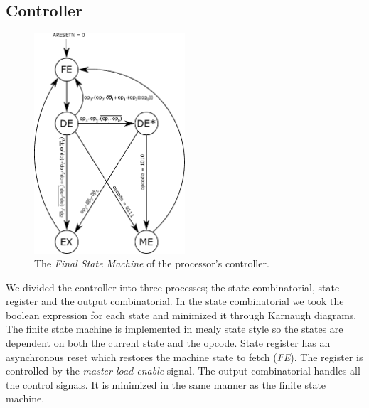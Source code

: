 \documentclass[a4,11pt]{article}
\begin{document}
\subsection{Controller}

\begin{figure}[h!]
	\centering
	\includegraphics[width=0.5\textwidth]{Figurer/procController_FSM_Mealy}
	\caption{The {\it Final State Machine} of the processor's controller.}
	\label{fig:fsm}
\end{figure}


We divided the controller into three processes; the state combinatorial, state register and
the output combinatorial. In the state combinatorial we took the boolean expression for each 
state and minimized it through Karnaugh diagrams. The finite state machine is implemented in 
mealy state style so the states are dependent on both the current state and the opcode. 
State register has an asynchronous reset which restores the machine state to fetch ({\it FE}). 
The register is controlled by the \emph{master load enable} signal. The output combinatorial 
handles all the control signals. It is minimized in the same manner as the finite state machine.
\end{document}
